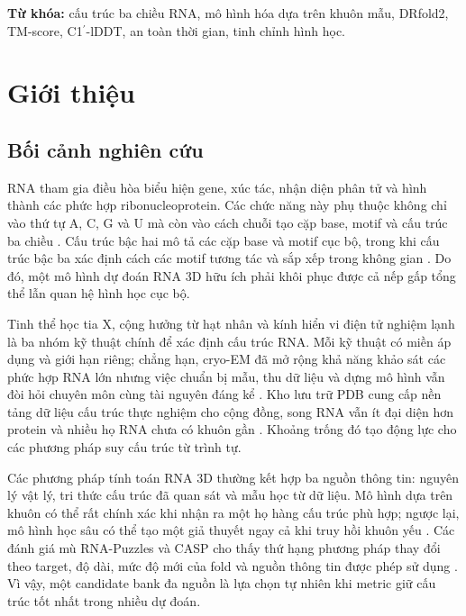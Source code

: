 \documentclass[12pt,a4paper,oneside]{report}
\newcommand{\cprime}{C1$^{\prime}$}
\begin{document}
\noindent\textbf{Từ khóa:} cấu trúc ba chiều RNA, mô hình hóa dựa trên khuôn mẫu,
DRfold2, TM-score, \cprime{}-lDDT, an toàn thời gian, tinh chỉnh hình học.

\tableofcontents
\listoftables
\listoffigures
\clearpage
{}

\chapter{Giới thiệu}
\label{chap:intro_vi}

\section{Bối cảnh nghiên cứu}

RNA tham gia điều hòa biểu hiện gene, xúc tác, nhận diện phân tử và hình thành các phức
hợp ribonucleoprotein. Các chức năng này phụ thuộc không chỉ vào thứ tự A, C, G và U mà
còn vào cách chuỗi tạo cặp base, motif và cấu trúc ba chiều
\cite{cao_rna_functions,tinoco_folding,butcher_tertiary}. Cấu trúc bậc hai mô tả các
cặp base và motif cục bộ, trong khi cấu trúc bậc ba xác định cách các motif tương tác và
sắp xếp trong không gian \cite{tinoco_folding,butcher_tertiary}. Do đó, một mô hình dự
đoán RNA 3D hữu ích phải khôi phục được cả nếp gấp tổng thể lẫn quan hệ hình học cục bộ.

Tinh thể học tia X, cộng hưởng từ hạt nhân và kính hiển vi điện tử nghiệm lạnh là ba
nhóm kỹ thuật chính để xác định cấu trúc RNA. Mỗi kỹ thuật có miền áp dụng và giới hạn
riêng; chẳng hạn, cryo-EM đã mở rộng khả năng khảo sát các phức hợp RNA lớn nhưng việc
chuẩn bị mẫu, thu dữ liệu và dựng mô hình vẫn đòi hỏi chuyên môn cùng tài nguyên đáng
kể \cite{zhang_experimental_review,ma_cryoem}. Kho lưu trữ PDB cung cấp nền tảng dữ
liệu cấu trúc thực nghiệm cho cộng đồng, song RNA vẫn ít đại diện hơn protein và nhiều
họ RNA chưa có khuôn gần \cite{pdb_archive,zhang_experimental_review}. Khoảng trống đó
tạo động lực cho các phương pháp suy cấu trúc từ trình tự.

Các phương pháp tính toán RNA 3D thường kết hợp ba nguồn thông tin: nguyên lý vật lý,
tri thức cấu trúc đã quan sát và mẫu học từ dữ liệu. Mô hình dựa trên khuôn có thể rất
chính xác khi nhận ra một họ hàng cấu trúc phù hợp; ngược lại, mô hình học sâu có thể
tạo một giả thuyết ngay cả khi truy hồi khuôn yếu \cite{rna_progress_review,drfold,
rhofoldplus,drfold2}. Các đánh giá mù RNA-Puzzles và CASP cho thấy thứ hạng phương pháp
thay đổi theo target, độ dài, mức độ mới của fold và nguồn thông tin được phép sử dụng
\cite{rna_puzzles,casp15,state_of_rnart}. Vì vậy, một candidate bank đa nguồn là lựa
chọn tự nhiên khi metric giữ cấu trúc tốt nhất trong nhiều dự đoán.
\end{document}
